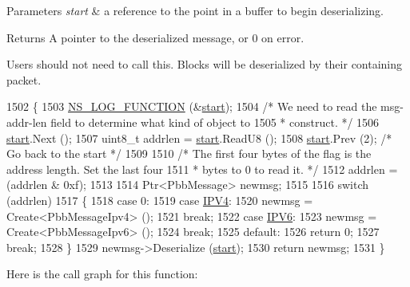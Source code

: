 \begin{DoxyParams}{Parameters}
{\em start} & a reference to the point in a buffer to begin deserializing. \\
\hline
\end{DoxyParams}
\begin{DoxyReturn}{Returns}
A pointer to the deserialized message, or 0 on error.
\end{DoxyReturn}
Users should not need to call this. Blocks will be deserialized by their containing packet. 
\begin{DoxyCode}
1502 \{
1503   \hyperlink{log-macros-disabled_8h_a90b90d5bad1f39cb1b64923ea94c0761}{NS\_LOG\_FUNCTION} (&\hyperlink{namespacevisualizer_1_1core_a2a35e5d8a34af358b508dac8635754e0}{start});
1504   \textcolor{comment}{/* We need to read the msg-addr-len field to determine what kind of object to}
1505 \textcolor{comment}{   * construct. */}
1506   \hyperlink{namespacevisualizer_1_1core_a2a35e5d8a34af358b508dac8635754e0}{start}.Next ();
1507   uint8\_t addrlen = \hyperlink{namespacevisualizer_1_1core_a2a35e5d8a34af358b508dac8635754e0}{start}.ReadU8 ();
1508   \hyperlink{namespacevisualizer_1_1core_a2a35e5d8a34af358b508dac8635754e0}{start}.Prev (2); \textcolor{comment}{/* Go back to the start */}
1509 
1510   \textcolor{comment}{/* The first four bytes of the flag is the address length.  Set the last four}
1511 \textcolor{comment}{   * bytes to 0 to read it. */}
1512   addrlen = (addrlen & 0xf);
1513 
1514   Ptr<PbbMessage> newmsg;
1515 
1516   \textcolor{keywordflow}{switch} (addrlen)
1517     \{
1518     \textcolor{keywordflow}{case} 0:
1519     \textcolor{keywordflow}{case} \hyperlink{namespacens3_a79988e6e8b09f64c6ffca894994cb033af56451cc069a62c29e3d7577328b5027}{IPV4}:
1520       newmsg = Create<PbbMessageIpv4> ();
1521       \textcolor{keywordflow}{break};
1522     \textcolor{keywordflow}{case} \hyperlink{namespacens3_a79988e6e8b09f64c6ffca894994cb033a84febcf5d7068ab3c05eb92da35ad2bc}{IPV6}:
1523       newmsg = Create<PbbMessageIpv6> ();
1524       \textcolor{keywordflow}{break};
1525     \textcolor{keywordflow}{default}:
1526       \textcolor{keywordflow}{return} 0;
1527       \textcolor{keywordflow}{break};
1528     \}
1529   newmsg->Deserialize (\hyperlink{namespacevisualizer_1_1core_a2a35e5d8a34af358b508dac8635754e0}{start});
1530   \textcolor{keywordflow}{return} newmsg;
1531 \}
\end{DoxyCode}


Here is the call graph for this function\+:




